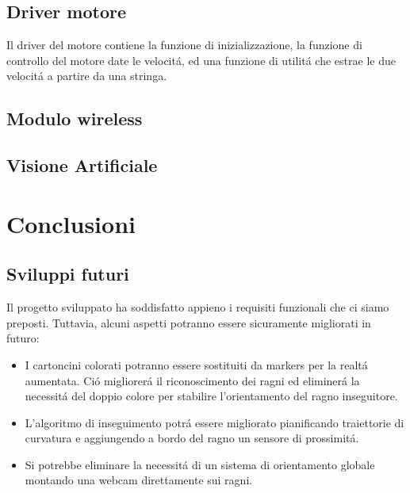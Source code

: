 \documentclass [11pt ,a4paper ,twoside ]{article}
\begin{document}
\subsection{Driver motore}

Il driver del motore contiene la funzione di inizializzazione, la funzione di controllo del motore date le velocit\'a, ed una funzione di utilit\'a che estrae le due velocit\'a a partire da una stringa.



\subsection{Modulo wireless}



\subsection{Visione Artificiale}



\section{Conclusioni}

\subsection{Sviluppi futuri}
Il progetto sviluppato ha soddisfatto appieno i requisiti funzionali che ci siamo preposti. Tuttavia, alcuni aspetti potranno essere sicuramente migliorati in futuro:
\begin{itemize}
\item I cartoncini colorati potranno essere sostituiti da markers per la realt\'a aumentata. Ci\'o migliorer\'a il riconoscimento dei ragni ed eliminer\'a la necessit\'a del doppio colore per stabilire l'orientamento del ragno inseguitore. 
\item L'algoritmo di inseguimento potr\'a essere migliorato pianificando traiettorie di curvatura e aggiungendo a bordo del ragno un sensore di prossimit\'a.
\item Si potrebbe eliminare la necessit\'a di un sistema di orientamento globale montando una webcam direttamente sui ragni.
\end{itemize}
\end{document}
